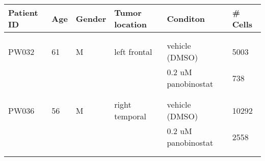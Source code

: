 \centering
\begin{tabular}[t]{llllll}
\toprule
Patient ID & Age & Gender & Tumor location & Conditon & \# Cells\\
\midrule
\cellcolor{gray!6}{PW030} & \cellcolor{gray!6}{65} & \cellcolor{gray!6}{M} & \cellcolor{gray!6}{right parietal} & \cellcolor{gray!6}{vehicle (DMSO)} & \cellcolor{gray!6}{17384}\\
\cellcolor{gray!6}{} & \cellcolor{gray!6}{} & \cellcolor{gray!6}{} & \cellcolor{gray!6}{} & \cellcolor{gray!6}{0.2 uM panobinostat} & \cellcolor{gray!6}{5686}\\
PW032 & 61 & M & left frontal & vehicle (DMSO) & 5003\\
 &  &  &  & 0.2 uM panobinostat & 738\\
\cellcolor{gray!6}{PW034} & \cellcolor{gray!6}{68} & \cellcolor{gray!6}{F} & \cellcolor{gray!6}{left parieto-occipital} & \cellcolor{gray!6}{vehicle (DMSO)} & \cellcolor{gray!6}{12375}\\
\cellcolor{gray!6}{} & \cellcolor{gray!6}{} & \cellcolor{gray!6}{} & \cellcolor{gray!6}{} & \cellcolor{gray!6}{0.2 uM panobinostat} & \cellcolor{gray!6}{1761}\\
PW036 & 56 & M & right temporal & vehicle (DMSO) & 10292\\
 &  &  &  & 0.2 uM panobinostat & 2558\\
\cellcolor{gray!6}{PW040} & \cellcolor{gray!6}{69} & \cellcolor{gray!6}{M} & \cellcolor{gray!6}{right temporal} & \cellcolor{gray!6}{vehicle (DMSO)} & \cellcolor{gray!6}{8901}\\
\cellcolor{gray!6}{} & \cellcolor{gray!6}{} & \cellcolor{gray!6}{} & \cellcolor{gray!6}{} & \cellcolor{gray!6}{0.2 uM panobinostat} & \cellcolor{gray!6}{1257}\\
\bottomrule
\end{tabular}
